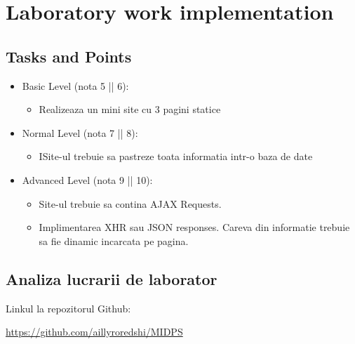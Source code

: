\section{Laboratory work implementation}

\subsection{Tasks and Points}
\begin{itemize}
	\item Basic Level (nota 5 || 6):
	
	\begin{itemize}
		\item Realizeaza un mini site cu 3 pagini statice
	\end{itemize}
	
	\item Normal Level (nota 7 || 8):
	
	\begin{itemize}
		\item ISite-ul trebuie sa pastreze toata informatia intr-o baza de date
	\end{itemize}
	\item Advanced Level (nota 9 || 10):
	
	\begin{itemize}
		\item Site-ul trebuie sa contina AJAX Requests.
    	\item Implimentarea XHR sau JSON responses. Careva din informatie trebuie sa fie dinamic incarcata pe pagina.
	\end{itemize}
\end{itemize}
    



\subsection{Analiza lucrarii de laborator}

Linkul la repozitorul Github:\\
\begin{center}
\url{https://github.com/aillyroredshi/MIDPS}
\end{center}

